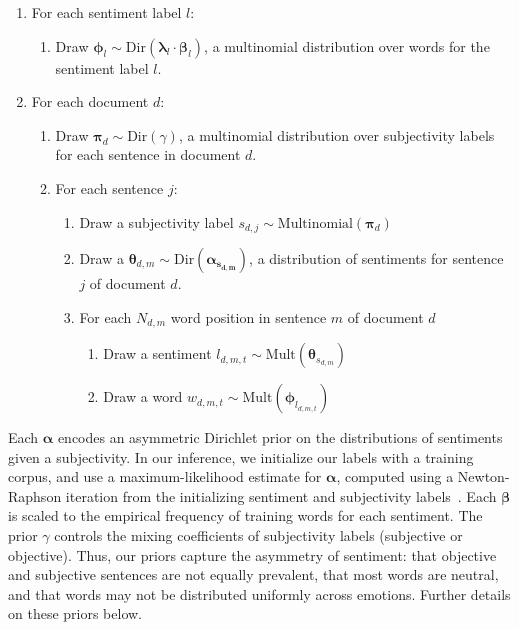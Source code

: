 \documentclass{article}
\begin{document}
\begin{enumerate}
\item For each sentiment label $l$:
\begin{enumerate}
\item Draw $\mathbf{\phi}_l \sim \mbox{Dir}(\mathbf{\lambda}_l \cdot \mathbf{\beta}_l)$, a multinomial distribution over words for the sentiment label $l$.
\end{enumerate}
\item For each document $d$:
\begin{enumerate}
\item Draw $\mathbf{\pi}_d \sim \mbox{Dir}(\gamma)$, a multinomial distribution over subjectivity labels for each sentence in document $d$.
\item For each sentence $j$:
\begin{enumerate}
\item Draw a subjectivity label $s_{d,j} \sim \mbox{Multinomial}(\mathbf{\pi}_d)$
\item Draw a $\mathbf{\theta}_{d,m} \sim \mbox{Dir}(\mathbf{\alpha_{s_{d,m}}})$, a distribution of sentiments for sentence $j$ of document $d$. 
\item For each $N_{d,m}$ word position in sentence $m$ of document $d$
\begin{enumerate}
\item Draw a sentiment $l_{d,m,t} \sim \mbox{Mult}(\mathbf{\theta}_{s_{d,m}})$
\item Draw a word $w_{d,m,t} \sim \mbox{Mult}(\mathbf{\phi}_{l_{d,m,t}})$
\end{enumerate}
\end{enumerate}
\end{enumerate}
\end{enumerate}

Each $\mathbf{\alpha}$ encodes an asymmetric Dirichlet prior on the
distributions of sentiments given a subjectivity. In our inference,
we initialize our labels with a training corpus, and use a
maximum-likelihood estimate for $\mathbf{\alpha}$, computed using
a Newton-Raphson iteration from the initializing sentiment and
subjectivity labels~\citep{minka00}. Each $\mathbf{\beta}$ is
scaled to the empirical frequency of training words for each
sentiment. The prior $\gamma$ controls the mixing coefficients of
subjectivity labels (subjective or objective). Thus, our priors
capture the asymmetry of sentiment: that objective and subjective
sentences are not equally prevalent, that most words are neutral,
and that words may not be distributed uniformly across emotions.
Further details on these priors below.
\end{document}
